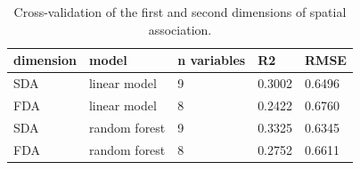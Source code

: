 \begin{table}[t]\centering
\caption{Cross-validation of the first and second dimensions of spatial association.}\label{tab:cv}
\begin{tabular}{lllll}
\hline
dimension & model & n variables & R2 & RMSE \\
\hline
SDA & linear model & 9 & 0.3002 & 0.6496 \\
FDA & linear model & 8 & 0.2422 & 0.6760 \\
SDA & random forest & 9 & 0.3325 & 0.6345 \\
FDA & random forest & 8 & 0.2752 & 0.6611 \\
\hline
\end{tabular}\end{table}
